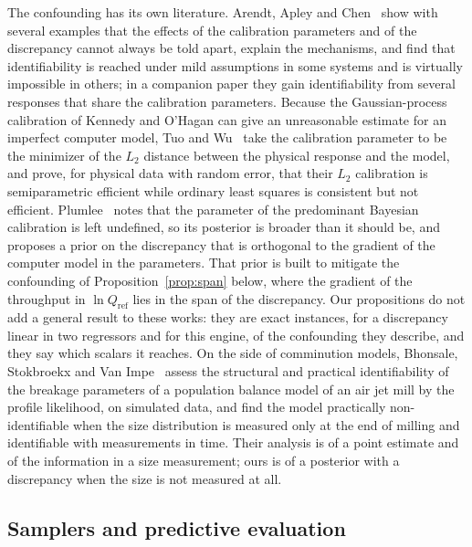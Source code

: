 \documentclass[journal]{IEEEtran}
\begin{document}
The confounding has its own literature. Arendt, Apley and Chen~\cite{arendt} show with several examples that the effects
of the calibration parameters and of the discrepancy cannot always be told apart, explain the mechanisms, and find that
identifiability is reached under mild assumptions in some systems and is virtually impossible in others; in a companion
paper they gain identifiability from several responses that share the calibration parameters. Because the
Gaussian-process calibration of Kennedy and O'Hagan can give an unreasonable estimate for an imperfect computer model,
Tuo and Wu~\cite{tuowu} take the calibration parameter to be the minimizer of the $L_2$ distance between the physical
response and the model, and prove, for physical data with random error, that their $L_2$ calibration is semiparametric
efficient while ordinary least squares is consistent but not efficient. Plumlee~\cite{plumlee} notes that the parameter of the predominant Bayesian calibration is left
undefined, so its posterior is broader than it should be, and proposes a prior on the discrepancy that is orthogonal to
the gradient of the computer model in the parameters. That prior is built to mitigate the confounding of
Proposition~\ref{prop:span} below, where the gradient of the throughput in $\ln Q_{\mathrm{ref}}$ lies in the span of the
discrepancy. Our propositions do not add a general result to these works: they are exact instances, for a discrepancy
linear in two regressors and for this engine, of the confounding they describe, and they say which scalars it reaches.
On the side of comminution models, Bhonsale, Stokbroekx and Van Impe~\cite{bhonsale} assess the structural and practical
identifiability of the breakage parameters of a population balance model of an air jet mill by the profile likelihood, on
simulated data, and find the model practically non-identifiable when the size distribution is measured only at the end of
milling and identifiable with measurements in time. Their analysis is of a point estimate and of the information in a size
measurement; ours is of a posterior with a discrepancy when the size is not measured at all.

\subsection{Samplers and predictive evaluation}
\end{document}
